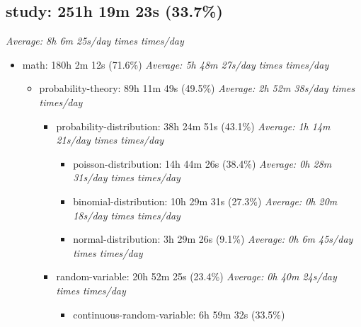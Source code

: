 \documentclass[12pt]{extarticle}
\begin{document}
{\fontsize{16}{19.2}\selectfont\subsection*{study: 251h 19m 23s (33.7\%)}}
\textit{Average: 8h 6m 25s/day  times  times/day}\par
\begin{itemize}[topsep=0pt, itemsep=-0.5ex]
    \item math: 180h 2m 12s (71.6\%)
        \textit{Average: 5h 48m 27s/day  times  times/day}\par
\begin{itemize}[topsep=0pt, itemsep=-0.5ex]
    \item probability-theory: 89h 11m 49s (49.5\%)
        \textit{Average: 2h 52m 38s/day  times  times/day}\par
\begin{itemize}[topsep=0pt, itemsep=-0.5ex]
    \item probability-distribution: 38h 24m 51s (43.1\%)
        \textit{Average: 1h 14m 21s/day  times  times/day}\par
\begin{itemize}[topsep=0pt, itemsep=-0.5ex]
    \item poisson-distribution: 14h 44m 26s (38.4\%)
        \textit{Average: 0h 28m 31s/day  times  times/day}\par
    \item binomial-distribution: 10h 29m 31s (27.3\%)
        \textit{Average: 0h 20m 18s/day  times  times/day}\par
    \item normal-distribution: 3h 29m 26s (9.1\%)
        \textit{Average: 0h 6m 45s/day  times  times/day}\par
\end{itemize}
    \item random-variable: 20h 52m 25s (23.4\%)
        \textit{Average: 0h 40m 24s/day  times  times/day}\par
\begin{itemize}[topsep=0pt, itemsep=-0.5ex]
    \item continuous-random-variable: 6h 59m 32s (33.5\%)

\end{itemize}
\end{itemize}
\end{itemize}
\end{itemize}
\end{document}
